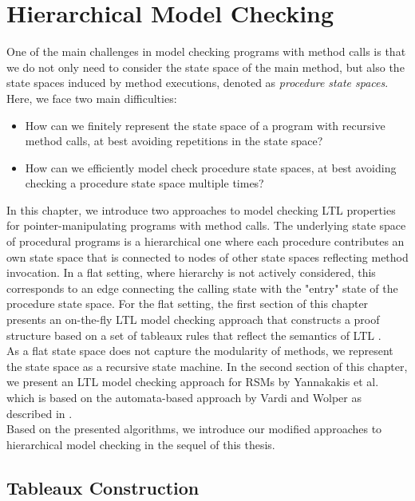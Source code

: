 \documentclass[a4paper, 12pt, twoside]{report}
\begin{document}
	\chapter{Hierarchical Model Checking}
	
	One of the main challenges in model checking programs with method calls is that we do not only need to consider the state space of the main method, but also the state spaces induced by method executions, denoted as \textit{procedure state spaces}. Here, we face two main difficulties:
	\begin{itemize}
		\item How can we finitely represent the state space of a program with recursive method calls, at best avoiding repetitions in the state space?
		\item How can we efficiently model check procedure state spaces, at best avoiding checking a procedure state space multiple times? 
	\end{itemize}
	
	In this chapter, we introduce two approaches to model checking LTL properties for pointer-manipulating programs with method calls. The underlying state space of procedural programs is a hierarchical one where each procedure contributes an own state space that is connected to nodes of other state spaces reflecting method invocation. In a flat setting, where hierarchy is not actively considered, this corresponds to an edge connecting the calling state with the "entry" state of the procedure state space. For the flat setting, the first section of this chapter presents an on-the-fly LTL model checking approach that constructs a proof structure based on a set of tableaux rules that reflect the semantics of LTL \cite{bhat1995efficient}. \\
	
	As a flat state space does not capture the modularity of methods, we represent the state space as a recursive state machine. In the second section of this chapter, we present an LTL model checking approach for RSMs by Yannakakis et al. which is based on the automata-based approach by Vardi and Wolper as described in \cite{vardi1986automata}.\\
	
	Based on the presented algorithms, we introduce our modified approaches to hierarchical model checking in the sequel of this thesis.
	
	\section{Tableaux Construction}\label{sec:tableaux}
	
\end{document}
